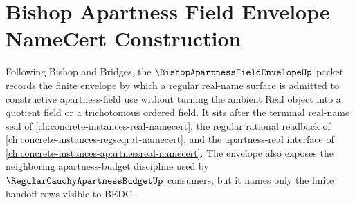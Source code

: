 \chapter{Bishop Apartness Field Envelope NameCert Construction}
\label{ch:concrete-instances-bishop-apartness-field-envelope-namecert}

Following Bishop and Bridges, the $\BishopApartnessFieldEnvelopeUp$ packet records the finite envelope by which a regular real-name surface is admitted to constructive apartness-field use without turning the ambient Real object into a quotient field or a trichotomous ordered field. It sits after the terminal real-name seal of \autoref{ch:concrete-instances-real-namecert}, the regular rational readback of \autoref{ch:concrete-instances-regseqrat-namecert}, and the apartness-real interface of \autoref{ch:concrete-instances-apartnessreal-namecert}. The envelope also exposes the neighboring apartness-budget discipline used by $\RegularCauchyApartnessBudgetUp$ consumers, but it names only the finite handoff rows visible to BEDC.

